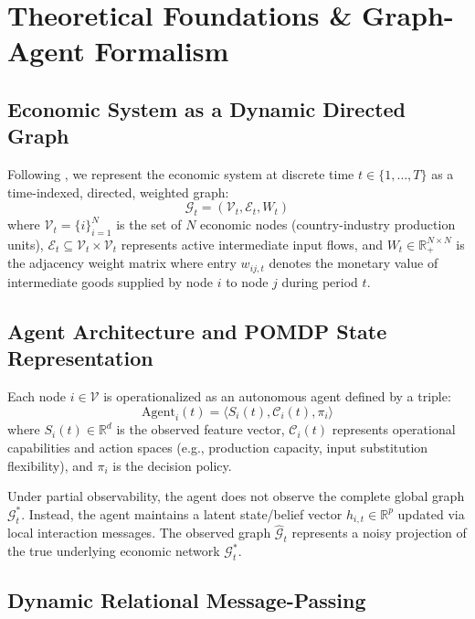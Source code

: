 \documentclass[11pt,a4paper]{article}
\newcommand{\R}{\mathbb{R}}
\newcommand{\G}{\mathcal{G}}
\newcommand{\V}{\mathcal{V}}
\newcommand{\Eset}{\mathcal{E}}
\begin{document}
\section{Theoretical Foundations \& Graph-Agent Formalism}
\label{sec:theory}

\subsection{Economic System as a Dynamic Directed Graph}

Following \citet{worldmodel2026graph}, we represent the economic system at discrete time $t \in \{1, \dots, T\}$ as a time-indexed, directed, weighted graph:
\begin{equation}
    \G_t = (\V_t, \Eset_t, W_t)
\end{equation}
where $\V_t = \{i\}_{i=1}^N$ is the set of $N$ economic nodes (country-industry production units), $\Eset_t \subseteq \V_t \times \V_t$ represents active intermediate input flows, and $W_t \in \R_+^{N \times N}$ is the adjacency weight matrix where entry $w_{ij,t}$ denotes the monetary value of intermediate goods supplied by node $i$ to node $j$ during period $t$.

\subsection{Agent Architecture and POMDP State Representation}

Each node $i \in \V$ is operationalized as an autonomous agent defined by a triple:
\begin{equation}
    \text{Agent}_i(t) = \langle S_i(t), \mathcal{C}_i(t), \pi_i \rangle
\end{equation}
where $S_i(t) \in \R^d$ is the observed feature vector, $\mathcal{C}_i(t)$ represents operational capabilities and action spaces (e.g., production capacity, input substitution flexibility), and $\pi_i$ is the decision policy.

Under partial observability, the agent does not observe the complete global graph $\G_t^*$. Instead, the agent maintains a latent state/belief vector $h_{i,t} \in \R^p$ updated via local interaction messages. The observed graph $\hat{\G}_t$ represents a noisy projection of the true underlying economic network $\G_t^*$.

\subsection{Dynamic Relational Message-Passing}
\end{document}
